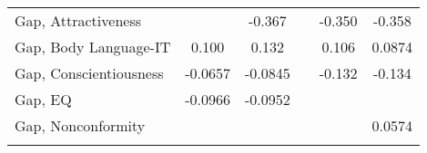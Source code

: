 {\begin{center}
{\begin{longtable}{l*{5}{c}}
            Gap, Attractiveness              &                       & -0.367\sym{***}       &                       & -0.350\sym{***}       & -0.358\sym{***}       \\
            \addlinespace
            Gap, Body Language-IT            & 0.100                 & 0.132                 &                       & 0.106                 & 0.0874                \\
            \addlinespace
            Gap, Conscientiousness           & -0.0657               & -0.0845               &                       & -0.132\sym{**}        & -0.134\sym{**}        \\
            \addlinespace
            Gap, EQ                          & -0.0966               & -0.0952               &                       &                       &                       \\
            \addlinespace
            Gap, Nonconformity               &                       &                       &                       &                       & 0.0574                \\
            \addlinespace



\end{longtable}}
\end{center}}
